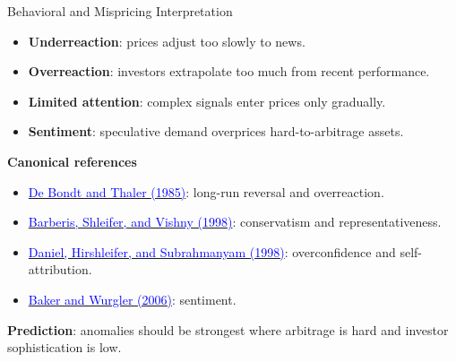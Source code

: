 \documentclass{beamer}
\begin{document}
\begin{frame}{Behavioral and Mispricing Interpretation}
	\begin{itemize}
		\item \textbf{Underreaction}: prices adjust too slowly to news.
		\item \textbf{Overreaction}: investors extrapolate too much from recent performance.
		\item \textbf{Limited attention}: complex signals enter prices only gradually.
		\item \textbf{Sentiment}: speculative demand overprices hard-to-arbitrage assets.
	\end{itemize}

	\vspace{0.2cm}
	\textbf{Canonical references}
	\begin{itemize}
		\item \href{https://doi.org/10.1111/j.1540-6261.1985.tb05004.x}{\textcolor{blue}{De Bondt and Thaler (1985)}}: long-run reversal and overreaction.
		\item \href{https://doi.org/10.1016/S0304-405X(98)00027-0}{\textcolor{blue}{Barberis, Shleifer, and Vishny (1998)}}: conservatism and representativeness.
		\item \href{https://doi.org/10.1111/0022-1082.00077}{\textcolor{blue}{Daniel, Hirshleifer, and Subrahmanyam (1998)}}: overconfidence and self-attribution.
		\item \href{https://doi.org/10.1111/j.1540-6261.2006.00885.x}{\textcolor{blue}{Baker and Wurgler (2006)}}: sentiment.
	\end{itemize}

	\textbf{Prediction}: anomalies should be strongest where arbitrage is hard and investor sophistication is low.
\end{frame}
\end{document}
